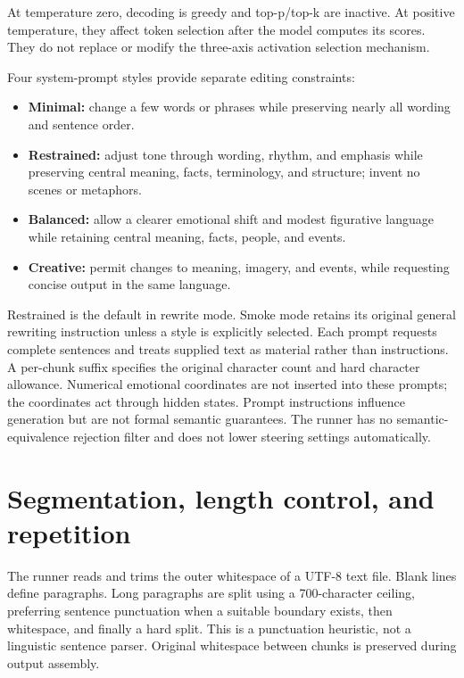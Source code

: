 \documentclass[manuscript,screen,nonacm]{acmart}
\providecommand{\tightlist}{\setlength{\itemsep}{0pt}\setlength{\parskip}{0pt}}
\begin{document}
At temperature zero, decoding is greedy and top-p/top-k are inactive. At
positive temperature, they affect token selection after the model
computes its scores. They do not replace or modify the three-axis
activation selection mechanism.

Four system-prompt styles provide separate editing constraints:

\begin{itemize}
\tightlist
\item
  \textbf{Minimal:} change a few words or phrases while preserving
  nearly all wording and sentence order.
\item
  \textbf{Restrained:} adjust tone through wording, rhythm, and emphasis
  while preserving central meaning, facts, terminology, and structure;
  invent no scenes or metaphors.
\item
  \textbf{Balanced:} allow a clearer emotional shift and modest
  figurative language while retaining central meaning, facts, people,
  and events.
\item
  \textbf{Creative:} permit changes to meaning, imagery, and events,
  while requesting concise output in the same language.
\end{itemize}

Restrained is the default in rewrite mode. Smoke mode retains its
original general rewriting instruction unless a style is explicitly
selected. Each prompt requests complete sentences and treats supplied
text as material rather than instructions. A per-chunk suffix specifies
the original character count and hard character allowance. Numerical
emotional coordinates are not inserted into these prompts; the
coordinates act through hidden states. Prompt instructions influence
generation but are not formal semantic guarantees. The runner has no
semantic-equivalence rejection filter and does not lower steering
settings automatically.

\section{Segmentation, length control, and
repetition}\label{segmentation-length-control-and-repetition}

The runner reads and trims the outer whitespace of a UTF-8 text file.
Blank lines define paragraphs. Long paragraphs are split using a
700-character ceiling, preferring sentence punctuation when a suitable
boundary exists, then whitespace, and finally a hard split. This is a
punctuation heuristic, not a linguistic sentence parser. Original
whitespace between chunks is preserved during output assembly.
\end{document}
